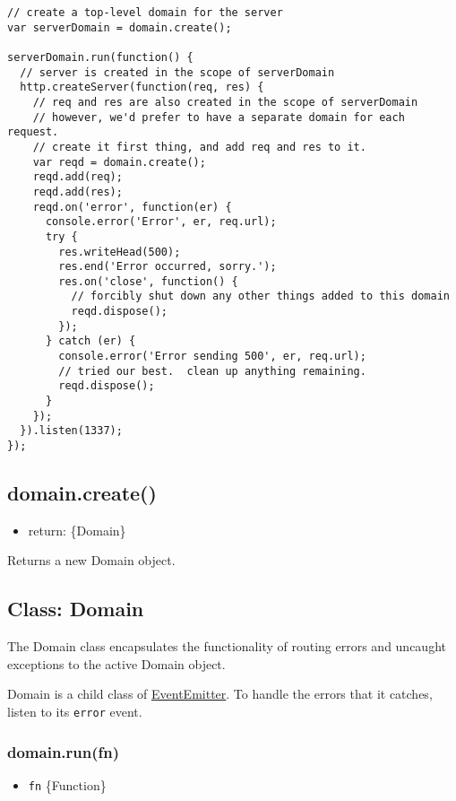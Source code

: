\begin{verbatim}
// create a top-level domain for the server
var serverDomain = domain.create();

serverDomain.run(function() {
  // server is created in the scope of serverDomain
  http.createServer(function(req, res) {
    // req and res are also created in the scope of serverDomain
    // however, we'd prefer to have a separate domain for each request.
    // create it first thing, and add req and res to it.
    var reqd = domain.create();
    reqd.add(req);
    reqd.add(res);
    reqd.on('error', function(er) {
      console.error('Error', er, req.url);
      try {
        res.writeHead(500);
        res.end('Error occurred, sorry.');
        res.on('close', function() {
          // forcibly shut down any other things added to this domain
          reqd.dispose();
        });
      } catch (er) {
        console.error('Error sending 500', er, req.url);
        // tried our best.  clean up anything remaining.
        reqd.dispose();
      }
    });
  }).listen(1337);
});
\end{verbatim}

\subsection{domain.create()}

\begin{itemize}
\item
  return: \{Domain\}
\end{itemize}

Returns a new Domain object.

\subsection{Class: Domain}

The Domain class encapsulates the functionality of routing errors and
uncaught exceptions to the active Domain object.

Domain is a child class of
\href{events.html\#events\_class\_events\_eventemitter}{EventEmitter}.
To handle the errors that it catches, listen to its \texttt{error}
event.

\subsubsection{domain.run(fn)}

\begin{itemize}
\item
  \texttt{fn} \{Function\}
\end{itemize}

